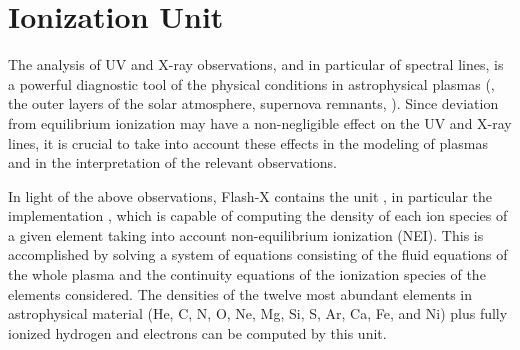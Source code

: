 \section{Ionization Unit}
\label{Sec:ionization}

The analysis of UV and X-ray observations, and in particular of
spectral lines, is a powerful diagnostic tool of the physical
conditions in  astrophysical plasmas (\eg, the outer layers of the
solar atmosphere, supernova remnants, \etc).  Since deviation from
equilibrium ionization may have a non-negligible effect on the UV and
X-ray lines, it is crucial to take into account these effects in the
modeling of plasmas and in the interpretation of the relevant
observations.

In light of the above observations, Flash-X contains the unit ,
in particular the implementation
, which is capable of computing the
density of each ion species of a given element taking into account
non-equilibrium ionization (NEI). This is accomplished by solving a
system of equations consisting of the fluid equations of the whole
plasma and the continuity equations of the ionization species of the
elements considered.  The densities of the twelve most abundant
elements in astrophysical material (He, C, N, O, Ne, Mg, Si, S, Ar,
Ca, Fe, and Ni) plus fully ionized hydrogen and electrons can be
computed by this unit.

